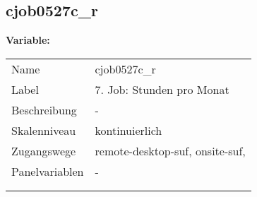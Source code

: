 	
	
	\subsection{cjob0527c\_r}
	\label{subSection:cjob0527c_r}

	\noindent\textbf{Variable:}\\
		\begin{tabular}{lL{11.3cm}}
			\label{tableVariable:cjob0527c_r}
			Name & cjob0527c\_r \\
			Label & 7. Job: Stunden pro Monat \\
			Beschreibung & - \\
			Skalenniveau & kontinuierlich \\
			Zugangswege &
				remote-desktop-suf,
				onsite-suf,
 \\
			Panelvariablen & -
			 \\
			 \\
 \\
		\end{tabular}





